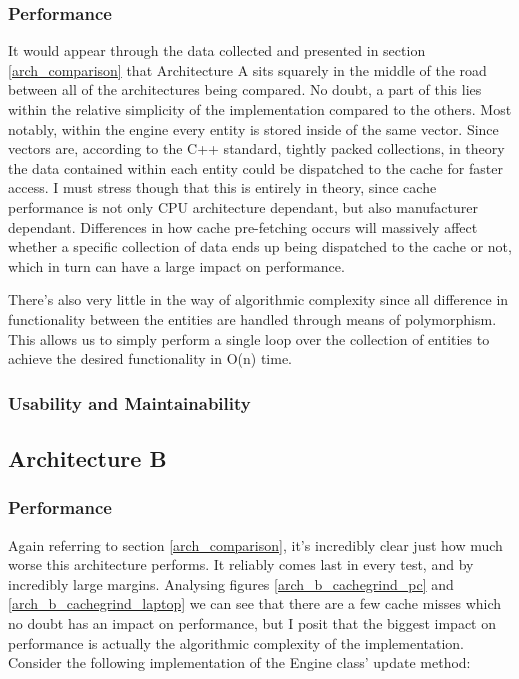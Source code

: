 \documentclass{article}
\begin{document}
\subsubsection{Performance}
It would appear through the data collected and presented in section
\ref{arch_comparison} that Architecture A sits squarely in the middle of the
road between all of the architectures being compared. No doubt, a part of this
lies within the relative simplicity of the implementation compared to the
others. Most notably, within the engine every entity is stored inside of the
same vector. Since vectors are, according to the C++ standard, tightly packed
collections, in theory the data contained within each entity could be dispatched
to the cache for faster access. I must stress though that this is entirely in
theory, since cache performance is not only CPU architecture dependant, but also
manufacturer dependant. Differences in how cache pre-fetching occurs will
massively affect whether a specific collection of data ends up being dispatched
to the cache or not, which in turn can have a large impact on performance.

There's also very little in the way of algorithmic complexity since all
difference in functionality between the entities are handled through means of
polymorphism. This allows us to simply perform a single loop over the collection
of entities to achieve the desired functionality in O(n) time.

\subsubsection{Usability and Maintainability}

\subsection{Architecture B}
\subsubsection{Performance}
Again referring to section \ref{arch_comparison}, it's incredibly clear just
how much worse this architecture performs. It reliably comes last in every test,
and by incredibly large margins. Analysing figures \ref{arch_b_cachegrind_pc}
and \ref{arch_b_cachegrind_laptop} we can see that there are a few cache misses
which no doubt has an impact on performance, but I posit that the biggest impact
on performance is actually the algorithmic complexity of the implementation.
Consider the following implementation of the Engine class' update method:
\end{document}
